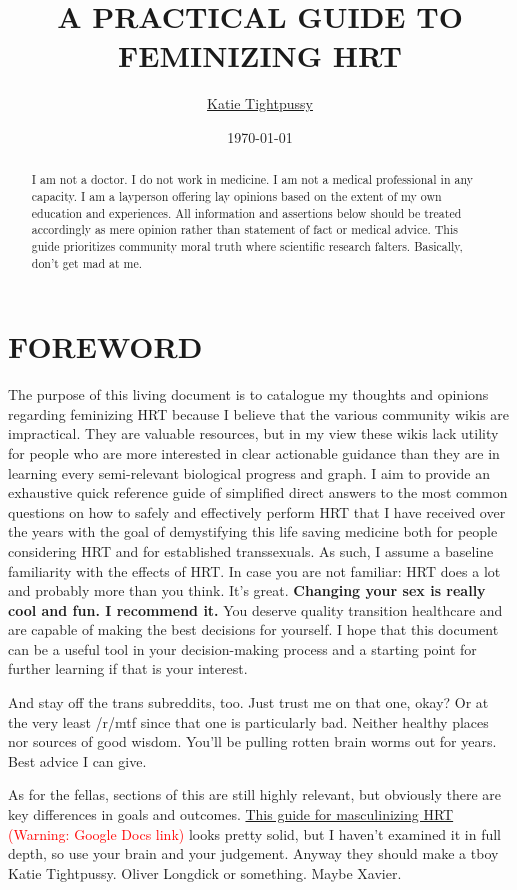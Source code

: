 \documentclass{article}
\title{A PRACTICAL GUIDE TO FEMINIZING HRT}
\author{\href{https://katea.gay/}{Katie Tightpussy}}
\date{\today}
\begin{document}
\maketitle
\tableofcontents
\begin{abstract}
    I am not a doctor. I do not work in medicine. I am not a medical professional in any capacity. I am a layperson offering lay opinions based on the extent of my own education and experiences. All information and assertions below should be treated accordingly as mere opinion rather than statement of fact or medical advice. This guide prioritizes community moral truth where scientific research falters. Basically, don’t get mad at me. 
\end{abstract}


\section{FOREWORD}

The purpose of this living document is to catalogue my thoughts and opinions regarding feminizing HRT because I believe that the various community wikis are impractical. They are valuable resources, but in my view these wikis lack utility for people who are more interested in clear actionable guidance than they are in learning every semi-relevant biological progress and graph. I aim to provide an exhaustive quick reference guide of simplified direct answers to the most common questions on how to safely and effectively perform HRT that I have received over the years with the goal of demystifying this life saving medicine both for people considering HRT and for established transsexuals. As such, I assume a baseline familiarity with the effects of HRT. In case you are not familiar: HRT does a lot and probably more than you think. It’s great. \textbf{Changing your sex is really cool and fun. I recommend it.} You deserve quality transition healthcare and are capable of making the best decisions for yourself. I hope that this document can be a useful tool in your decision-making process and a starting point for further learning if that is your interest.

And stay off the trans subreddits, too. Just trust me on that one, okay? Or at the very least /r/mtf since that one is particularly bad. Neither healthy places nor sources of good wisdom. You’ll be pulling rotten brain worms out for years. Best advice I can give.

As for the fellas, sections of this are still highly relevant, but obviously there are key differences in goals and outcomes. \href{https://docs.google.com/document/d/1DXFxzN0XTudPZez\_SO61fpqncRLPH\_Be\_QG\_8Pcz9LU/edit?tab=t.0}{This guide for masculinizing HRT} \textcolor{red}{(Warning: Google Docs link)} looks pretty solid, but I haven’t examined it in full depth, so use your brain and your judgement. Anyway they should make a tboy Katie Tightpussy. Oliver Longdick or something. Maybe Xavier.
\end{document}
